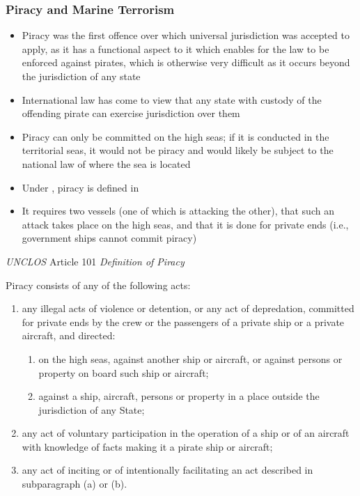 \subsubsection{Piracy and Marine Terrorism}
\begin{itemize}
    \item Piracy was the first offence over which universal jurisdiction was accepted to apply, as it has a functional aspect to it which enables for the law to be enforced against pirates, which is otherwise very difficult as it occurs beyond the jurisdiction of any state
    \item International law has come to view that any state with custody of the offending pirate can exercise jurisdiction over them
    \item Piracy can only be committed on the high seas; if it is conducted in the territorial seas, it would not be piracy and would likely be subject to the national law of where the sea is located
    \item Under , piracy is defined in 
    \item It requires two vessels (one of which is attacking the other), that such an attack takes place on the high seas, and that it is done for private ends (i.e., government ships cannot commit piracy)
\end{itemize}

\begin{conventiondetails}{\textit{UNCLOS} Article 101}
    \flushleft
    \textit{Definition of Piracy}

    \vspace{\baselineskip}

    Piracy consists of any of the following acts:
    \begin{enumerate}[label=(\alph*)]
        \item any illegal acts of violence or detention, or any act of depredation, committed for private ends by the crew or the passengers of a private ship or a private aircraft, and directed:
        \begin{enumerate}[label=(\roman*)]
            \item on the high seas, against another ship or aircraft, or against persons or property on board such ship or aircraft;
            \item against a ship, aircraft, persons or property in a place outside the jurisdiction of any State;
        \end{enumerate}
        \item any act of voluntary participation in the operation of a ship or of an aircraft with knowledge of facts making it a pirate ship or aircraft;
        \item any act of inciting or of intentionally facilitating an act described in subparagraph (a) or (b).
    \end{enumerate}
\end{conventiondetails}

